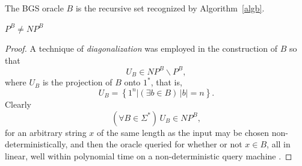 \documentclass[letterpaper]{article}
\begin{document}
\begin{definition}\label{bgsb}
The BGS oracle $B$ is the recursive set recognized by Algorithm~\ref{algb}.
\end{definition}
\begin{theorem}
	$P^B\ne NP^B$
\end{theorem}
\begin{proof}
A technique of \textit{diagonalization} was employed in the construction of $B$ so that
\begin{equation}
U_B\in NP^B\operatorname\backslash P^B,
\end{equation}
where $U_B$ is the projection of $B$ onto $1^{*}$, that is,
\begin{equation}
U_B=\left\{1^n\left|(\exists b\in B)\,|b|=n\right.\right\}.
\end{equation}
Clearly
\begin{equation}
(\forall B\in\Sigma^{*})\,U_B\in NP^B,
\end{equation}
for an arbitrary string $x$ of the same length as the input may be chosen non-deterministically, and then the oracle queried for whether or not $x\in B$, all in linear, well within polynomial time on a non-deterministic query machine \cite{baker1975relativizations,spielman2001adv, feigenbaum2010bgs,holenstein2010complex,moshkovitz2012rel}.
\end{proof}
\end{document}
